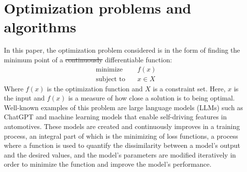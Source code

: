 \section{Optimization problems and algorithms}

In this paper, the optimization problem considered is in the form of finding the minimum point of a \sout{continuously} differentiable function:
\begin{subequations}\label{opt prob}
  \begin{align}
    \textrm{minimize} &\quad f(x) \\
    \textrm{subject to} &\quad x \in X
  \end{align}
\end{subequations}
Where  \(f(x)\) is the optimization function and \(X\) is a constraint set. Here, \(x\) is the input  and \(f(x)\) is a measure of how close a solution is to being optimal. Well-known examples of this problem are large language models (LLMs) such as ChatGPT and machine learning models that enable self-driving features in automotives. These models are created and continuously improves in a training process, an integral part of which is the minimizing of loss functions, a process where a function is used to quantify the dissimilarity between a model's output and the desired values, and the model's parameters are modified iteratively in order to minimize the function and improve the model's performance.

